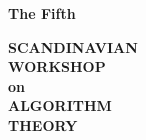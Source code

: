  \pagestyle{empty}
      
          
 
\addtolength{\topmargin}{-0.7in}    %
\setlength{\textheight}{21.5cm}      %

\setlength{\textwidth}{18cm}
\setlength{\evensidemargin}{-1cm}
\setlength{\oddsidemargin}{-1cm}
\setlength{\columnsep}{20pt}
 
\addtolength{\itemsep}{-1ex}
\addtolength{\itemsep}{-1.8mm}
\addtolength{\topsep}{-1.5ex}
\renewcommand{\baselinestretch}{1.0}
 
\newcommand{\what}[1]{{\it #1}}
\newcommand{\who}{\rm}
\newcommand{\where}[1]{(#1)}
\newcommand{\subhead}[1]{{\normalsize\sl #1\ }}

\newenvironment{session}{\begin{description}\vspace{-1ex}}{\end{description}}



\parskip=4pt
\parindent=0pt

\vspace{3cm}

\begin{center}
{\Large\bf The Fifth}

\vspace{0.5cm}
 
{\huge\bf SCANDINAVIAN \\[0.3cm]
          WORKSHOP \\[0.3cm]
          on \\[0.3cm]
          ALGORITHM \\[0.3cm]
          THEORY \\[0.3cm]
}
\end{center}


%
%
%
%
%
%
%

